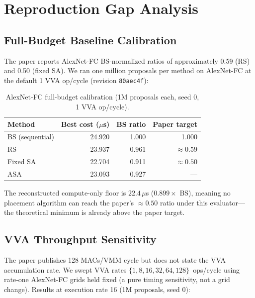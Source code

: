 \documentclass[10pt,conference]{IEEEtran}
\begin{document}
\section{Reproduction Gap Analysis}
\label{sec:repro-gap}

\subsection{Full-Budget Baseline Calibration}
\label{sec:calib}

The paper reports AlexNet-FC BS-normalized ratios of approximately 0.59 (RS)
and 0.50 (fixed SA).  We ran one million proposals per method on AlexNet-FC at
the default 1 VVA op/cycle (revision \texttt{80aec4f}):

\begin{table}[htbp]
  \caption{AlexNet-FC full-budget calibration (1M proposals each, seed 0,
           1 VVA op/cycle).}
  \label{tab:calib}
  \centering
  \begin{tabular}{lrrr}
    \toprule
    Method & Best cost ($\mu$s) & BS ratio & Paper target \\
    \midrule
    BS (sequential) & 24.920 & 1.000 & 1.000 \\
    RS              & 23.937 & 0.961 & ${\approx}0.59$ \\
    Fixed SA        & 22.704 & 0.911 & ${\approx}0.50$ \\
    ASA             & 23.093 & 0.927 & --- \\
    \bottomrule
  \end{tabular}
\end{table}

The reconstructed compute-only floor is $22.4\,\mu$s ($0.899 \times$ BS),
meaning no placement algorithm can reach the paper's ${\approx}0.50$ ratio under
this evaluator---the theoretical minimum is already above the paper target.

\subsection{VVA Throughput Sensitivity}

The paper publishes 128 MACs/VMM cycle but does not state the VVA
accumulation rate.  We swept VVA rates $\{1, 8, 16, 32, 64, 128\}$~ops/cycle
using rate-one AlexNet-FC grids held fixed (a pure timing sensitivity, not
a grid change).  Results at execution rate 16 (1M proposals, seed 0):
\end{document}
